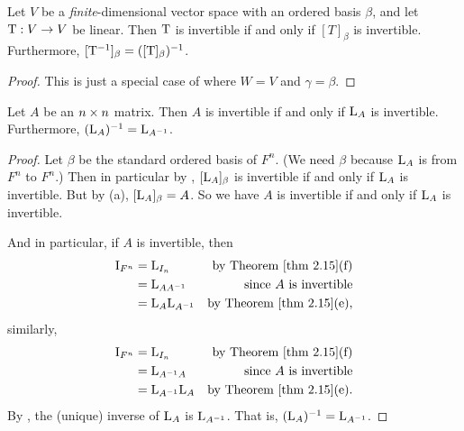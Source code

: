 \begin{corollary} \label{corollary 2.18.1}
Let \(V\) be a \emph{finite}-dimensional vector space with an ordered basis \(\beta\), and let \(\mathrm{T} : V \to V\) be linear.
Then \(\mathrm{T}\) is invertible if and only if \([T]_\beta\)
is invertible.
Furthermore, \([\mathrm{T}^{-1}]_{\beta} = ([\mathrm{T}]_{\beta})^{-1}\).
\end{corollary}

\begin{proof}
This is just a special case of  where \(W = V\) and \(\gamma = \beta\).
\end{proof}

\begin{corollary} \label{corollary 2.18.2}
Let \(A\) be an \(n \times n\) matrix.
Then \(A\) is invertible if and only if \(\mathrm{L}_A\) is invertible. Furthermore, \((\mathrm{L}_A)^{-1} = \mathrm{L}_{A^{-1}}\).
\end{corollary}

\begin{proof}
Let \(\beta\) be the standard ordered basis of \(F^n\).
(We need \(\beta\) because \(\mathrm{L}_A\) is from \(F^n\) to \(F^n\).)
Then in particular by , \([\mathrm{L}_A]_{\beta}\) is invertible if and only if \(\mathrm{L}_A\) is invertible.
But by (a), \([\mathrm{L}_A]_{\beta} = A\).
So we have \(A\) is invertible if and only if \(\mathrm{L}_A\) is invertible.

And in particular, if \(A\) is invertible, then
\begin{align*}
    \mathrm{I}_{F^n} & = \LMTRAN_{I_n} & \text{by \THM{2.15}(f)} \\
                     & = \LMTRAN_{A A^{-1}} & \text{since \(A\) is invertible} \\
                     & = \LMTRAN_A \LMTRAN_{A^{-1}} & \text{by \THM{2.15}(e)},
\end{align*}
similarly,
\begin{align*}
    \mathrm{I}_{F^n} & = \LMTRAN_{I_n} & \text{by \THM{2.15}(f)} \\
                     & = \LMTRAN_{A^{-1} A} & \text{since \(A\) is invertible} \\
                     & = \LMTRAN_{A^{-1}} \LMTRAN_A & \text{by \THM{2.15}(e)}.
\end{align*}
By , the (unique) inverse of \(\mathrm{L}_A\) is \(\mathrm{L}_{A^{-1}}\).
That is, \((\mathrm{L}_A)^{-1} = \mathrm{L}_{A^{-1}}\).
\end{proof}

